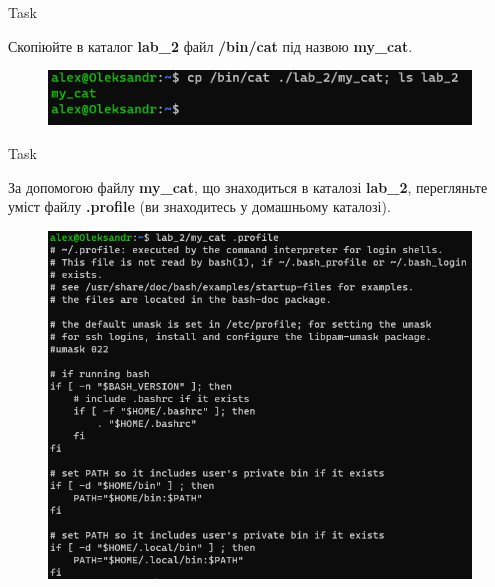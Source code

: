 \documentclass[a4paper,12pt]{article}
\newcommand{\RomanNumeralCaps}[1]{\MakeUppercase{\romannumeral #1}}
\begin{document}
    \begin{center}
        \Large{Task \RomanNumeralCaps{2}}
    \end{center}
    Скопіюйте в каталог \textbf{lab\_2} файл \textbf{/bin/cat} під назвою \textbf{my\_cat}.
    \begin{figure}[h!]
        \begin{minipage}[h]{1\linewidth}
            \centering
            \includegraphics[width=0.6\linewidth]{Prt sc/Figure_2.png}  
        \end{minipage}
    \end{figure}

    \begin{center}
        \Large{Task \RomanNumeralCaps{3}}
    \end{center}
    За допомогою файлу \textbf{my\_cat}, що знаходиться в каталозі \textbf{lab\_2}, перегляньте уміст файлу \textbf{.profile} (ви знаходитесь у домашньому каталозі).
    \begin{figure}[h!]
        \begin{minipage}[h]{1\linewidth}
            \centering
            \includegraphics[width=0.7\linewidth]{Prt sc/Figure_3.png}  
        \end{minipage}
    \end{figure}
\end{document}
